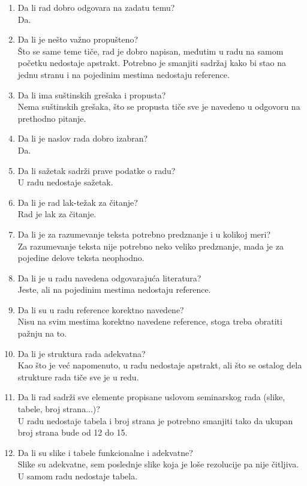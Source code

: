\documentclass[a4paper]{report}
\begin{document}
\begin{enumerate}
\item Da li rad dobro odgovara na zadatu temu?\\ Da.
\item Da li je nešto važno propušteno?\\ Što se same teme tiče, rad je dobro napisan, međutim u radu na samom početku nedostaje apstrakt. Potrebno je smanjiti sadržaj kako bi stao na jednu stranu i na pojedinim mestima nedostaju reference.
\item Da li ima suštinskih grešaka i propusta?\\  Nema suštinskih grešaka, što se propusta tiče sve je navedeno u odgovoru na prethodno pitanje.
\item Da li je naslov rada dobro izabran?\\ Da.
\item Da li sažetak sadrži prave podatke o radu?\\U radu nedostaje sažetak.
\item Da li je rad lak-težak za čitanje?\\Rad je lak za čitanje.
\item Da li je za razumevanje teksta potrebno predznanje i u kolikoj meri?\\Za razumevanje teksta nije potrebno neko veliko predznanje, mada je za pojedine delove teksta neophodno. 
\item Da li je u radu navedena odgovarajuća literatura?\\ Jeste, ali na pojedinim mestima nedostaju reference.
\item Da li su u radu reference korektno navedene?\\ Nisu na svim mestima korektno navedene reference, stoga treba obratiti pažnju na to.
\item Da li je struktura rada adekvatna?\\Kao što je već napomenuto, u radu nedostaje apstrakt, ali što se ostalog dela strukture rada tiče sve je u redu.
\item Da li rad sadrži sve elemente propisane uslovom seminarskog rada (slike, tabele, broj strana...)?\\U radu nedostaje tabela i broj strana je potrebno smanjiti tako da ukupan broj strana bude od 12 do 15.
\item Da li su slike i tabele funkcionalne i adekvatne?\\Slike su adekvatne, sem poslednje slike koja je loše rezolucije pa nije čitljiva. U samom radu nedostaje tabela.
\end{enumerate}
\end{document}
